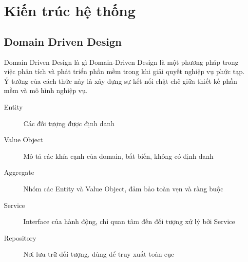 \section{Kiến trúc hệ thống}

\subsection{Domain Driven Design}

\begin{frame}
	\begin{block}{Domain Driven Design là gì}
		\alert{Domain-Driven Design} là một phương pháp trong việc phân tích và phát triển phần mềm trong khi giải quyết nghiệp vụ phức tạp. Ý tưởng của cách thức này là xây dựng sự kết nối chặt chẽ giữa thiết kế phần mềm và mô hình nghiệp vụ.
	\end{block}
	\begin{description}
		\item[Entity] Các đối tượng được định danh
		\item[Value Object] Mô tả các khía cạnh của domain, bất biến, không có định danh
		\item[Aggregate] Nhóm các Entity và Value Object, đảm bảo toàn vẹn và ràng buộc
		\item[Service] Interface của hành động, chỉ quan tâm đến đối tượng xử lý bởi Service
		\item[Repository] Nơi lưu trữ đối tượng, dùng để truy xuất toàn cục
	\end{description}
\end{frame}



